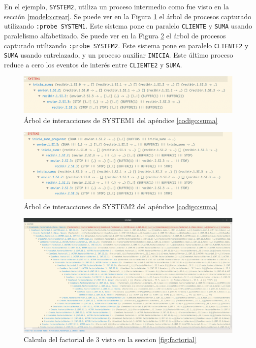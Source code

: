 En el ejemplo, \verb=SYSTEM2=, utiliza un proceso intermedio como fue visto en la sección \ref{modelo:crear}. Se puede ver en la Figura \ref{modelo:suma:system1} el árbol de procesos capturado utilizando \verb=:probe SYSTEM1=. Este sistema pone en paralelo \verb-CLIENTE- y \verb-SUMA- usando paralelismo alfabetizado. Se puede ver en la Figura \ref{modelo:suma:system2} el árbol de procesos capturado utilizando \verb=:probe SYSTEM2=. Este sistema pone en paralelo \verb-CLIENTE2- y \verb-SUMA- usando entrelazado, y un proceso auxiliar \verb-INICIA-. Este último proceso reduce a cero los eventos de interés entre \verb-CLIENTE2- y \verb-SUMA-.

\begin{figure}[H]
\begin{center}
\includegraphics[width=15 cm]{img/sumasystem1.png}
\caption{Árbol de interacciones de SYSTEM1 del apéndice \ref{codigo:suma}}
\label{modelo:suma:system1}
\end{center}
\end{figure}

\begin{figure}[H]
\begin{center}
\includegraphics[width=15 cm]{img/sumasystem2.png}
\caption{Árbol de interacciones de SYSTEM2 del apéndice \ref{codigo:suma}}
\label{modelo:suma:system2}
\end{center}
\end{figure}

\begin{figure}
\begin{center}
\includegraphics[width=24 cm, angle=90]{img/fact.png}
\caption{Calculo del factorial de 3 visto en la seccion \ref{fig:factorial}}\label{modelo:grafo}
\end{center}
\end{figure}

